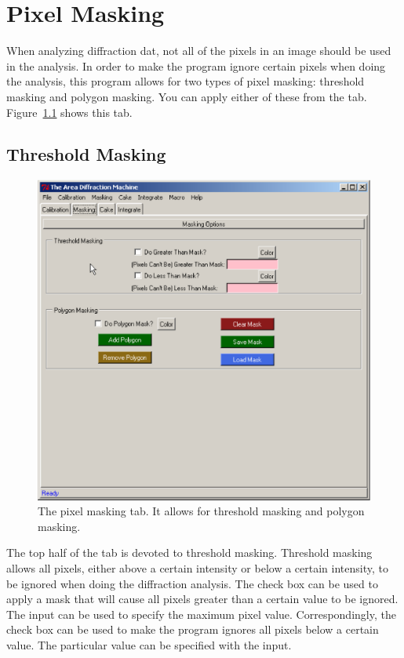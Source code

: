 \chapter{Pixel Masking}\label{pixel_masking}

When analyzing diffraction dat, not all of the pixels in 
an image should be used in the analysis. In order to make 
the program ignore certain pixels when doing the analysis, 
this program allows for two types of pixel masking:
threshold masking and polygon masking. You can 
apply either of these from the 
 tab. Figure~\ref{masking_tab}
shows this tab. 

\section{Threshold Masking}

\begin{figure}
    \centering
    \includegraphics[scale=.75]{figures/masking_tab.eps}
    \caption{The pixel masking tab. It allows for threshold 
    masking and polygon masking.} 
    \label{masking_tab}
\end{figure}

The top half of the  tab is devoted to 
threshold masking. Threshold masking allows all pixels, 
either above a certain intensity or below a certain 
intensity, to be ignored when doing the diffraction 
analysis. The  check box can 
be used to apply a mask that will cause all pixels 
greater than a certain value to be ignored.
The  input 
can be used to specify the maximum pixel value.
Correspondingly, the  check box
can be used to make the program ignores all
pixels below a certain value. The particular value can 
be specified with the  input. 


